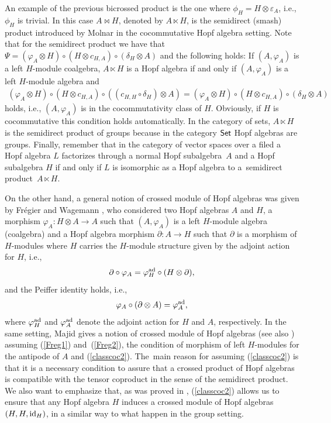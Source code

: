 \documentclass[pdftex]{sigma}
\numberwithin{equation}{section}
\newcommand{\ot}{\otimes}
\newcommand{\co}{\circ}
\begin{document}
\begin{Remark}
An example of the previous bicrossed product is the one where $\phi_{H}= H\otimes\varepsilon_{A}$, i.e., $\phi_{H}$ is trivial. In this case $A\bowtie H$, denoted by $A\ltimes H$, is the semidirect (smash) product introduced by Molnar \cite{Molnar} in the cocommutative Hopf algebra setting. Note that for the semidirect product we have that $\Psi=(\varphi_{A}\otimes H)\circ (H\otimes c_{H,A})\circ (\delta_{H}\otimes A)$ and the following holds: If $(A,\varphi_{A})$ is a left $H$-module coalgebra, $A\ltimes H$ is a Hopf algebra if and only if $(A,\varphi_{A})$ is a left $H$-module algebra and
\begin{gather}\label{classcoc2}
	(\varphi_{A}\otimes H)\circ(H\otimes c_{H,A})\circ((c_{H,H}\circ\delta_{H})\otimes A)=(\varphi_{A}\otimes H)\circ(H\otimes c_{H,A})\circ(\delta_{H}\otimes A)
\end{gather}
holds, i.e., $(A,\varphi_{A})$ is in the cocommutativity class of $H$. Obviously, if $H$ is cocommutative this condition holds automatically. In the category of sets, $A\ltimes H$ is the semidirect product of groups because in the category ${\sf Set}$ Hopf algebras are groups. Finally, remember that in the category of vector spaces over a filed a Hopf algebra $L$ factorizes through a normal Hopf subalgebra~$A$
and a Hopf subalgebra $H$ if and only if $L$ is isomorphic as a Hopf algebra to a~semidirect product~${A\ltimes H}$.

On the other hand, a general notion of crossed module of Hopf algebras was given by Fr\'egier and Wagemann \cite{FW}, who considered two Hopf algebras $A$ and $H$, a morphism $\varphi_A\colon H\ot A\rightarrow A$ such that $(A, \varphi_A)$ is a left $H$-module algebra (coalgebra) and a Hopf algebra morphism $\partial\colon A\rightarrow H$ such that $\partial$ is a morphism of $H$-modules where $H$ carries the $H$-module structure given by the adjoint action for $H$, i.e.,
\begin{equation}
	\label{Freg1}
	\partial\co \varphi_A=\varphi_{H}^{{\rm ad}}\co (H\ot \partial),
\end{equation}
and the Peiffer identity holds, i.e.,
\begin{equation}
	\label{Freg2}
	\varphi_A\co (\partial\ot A)=\varphi_{A}^{{\rm ad}},
\end{equation}
where $\varphi^{{\rm ad}}_{H}$ and $\varphi^{{\rm ad}}_{A}$ denote the adjoint action for $H$ and $A$, respectively. In the same setting, Majid \cite{MA2} gives a notion of crossed module of Hopf algebras (see also \cite{Faria}) assuming (\ref{Freg1}) and~(\ref{Freg2}), the condition of morphism of left $H$-modules for the antipode of $A$ and (\ref{classcoc2}). The~main reason for assuming (\ref{classcoc2}) is that it is a necessary condition to assure that a crossed product of Hopf algebras is compatible with the tensor coproduct in the sense of the semidirect product. We also want to emphasize that, as was proved in \cite{TAC}, (\ref{classcoc2}) allows us to ensure that any Hopf algebra $H$ induces a crossed module of Hopf algebras $(H,H,{\rm id}_H)$, in a similar way to what happen in the group setting.
\end{Remark}
\end{document}
